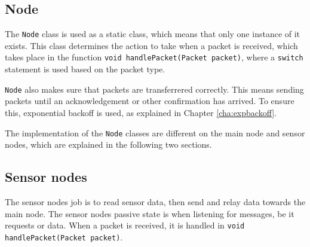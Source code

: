 \subsection{Node}
The \texttt{Node} class is used as a static class, which means that only one instance of it exists. This class determines the action to take when a packet is received, which takes place in the function \texttt{void handlePacket(Packet packet)}, where a \texttt{switch} statement is used based on the packet type.

\texttt{Node} also makes sure that packets are transferrered correctly. This means sending packets until an acknowledgement or other confirmation has arrived. To ensure this, exponential backoff is used, as explained in Chapter \ref{cha:expbackoff}.

The implementation of the \texttt{Node} classes are different on the main node and sensor nodes, which are explained in the following two sections.

\subsection{Sensor nodes} 
The sensor nodes job is to read sensor data, then send and relay data towards the main node. The sensor nodes passive state is when listening for messages, be it requests or data. When a packet is received, it is handled in \texttt{void handlePacket(Packet packet)}.  

